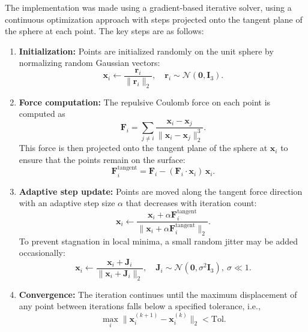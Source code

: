 The implementation was made using a gradient-based iterative solver, using a continuous optimization approach with steps projected onto the tangent plane of the sphere at each point. The key steps are as follows:

\begin{enumerate}
    \item \textbf{Initialization:} Points are initialized randomly on the unit sphere by normalizing random Gaussian vectors:
    \begin{equation}
    \mathbf{x}_i \leftarrow \frac{\mathbf{r}_i}{\|\mathbf{r}_i\|_2}, \quad \mathbf{r}_i \sim \mathcal{N}(\mathbf{0}, \mathbf{I}_3).
    \end{equation}

    \item \textbf{Force computation:} The repulsive Coulomb force on each point is computed as
    \begin{equation}
    \mathbf{F}_i = \sum_{j \neq i} \frac{\mathbf{x}_i - \mathbf{x}_j}{\|\mathbf{x}_i - \mathbf{x}_j\|_2^3}.
    \end{equation}
    This force is then projected onto the tangent plane of the sphere at $\mathbf{x}_i$ to ensure that the points remain on the surface:
    \begin{equation}
    \mathbf{F}_i^{\text{tangent}} = \mathbf{F}_i - (\mathbf{F}_i \cdot \mathbf{x}_i)\, \mathbf{x}_i.
    \end{equation}

    \item \textbf{Adaptive step update:} Points are moved along the tangent force direction with an adaptive step size $\alpha$ that decreases with iteration count:
    \begin{equation}
    \mathbf{x}_i \leftarrow \frac{\mathbf{x}_i + \alpha \mathbf{F}_i^{\text{tangent}}}{\|\mathbf{x}_i + \alpha \mathbf{F}_i^{\text{tangent}}\|_2}.
    \end{equation}
    To prevent stagnation in local minima, a small random jitter may be added occasionally:
    \begin{equation}
    \mathbf{x}_i \leftarrow \frac{\mathbf{x}_i + \mathbf{J}_i}{\|\mathbf{x}_i + \mathbf{J}_i\|_2}, \quad \mathbf{J}_i \sim \mathcal{N}(\mathbf{0}, \sigma^2 \mathbf{I}_3), \ \sigma \ll 1.
    \end{equation}

    \item \textbf{Convergence:} The iteration continues until the maximum displacement of any point between iterations falls below a specified tolerance, i.e.,
    \begin{equation}
    \max_i \|\mathbf{x}_i^{(k+1)} - \mathbf{x}_i^{(k)}\|_2 < \text{Tol}.
    \end{equation}
\end{enumerate}


